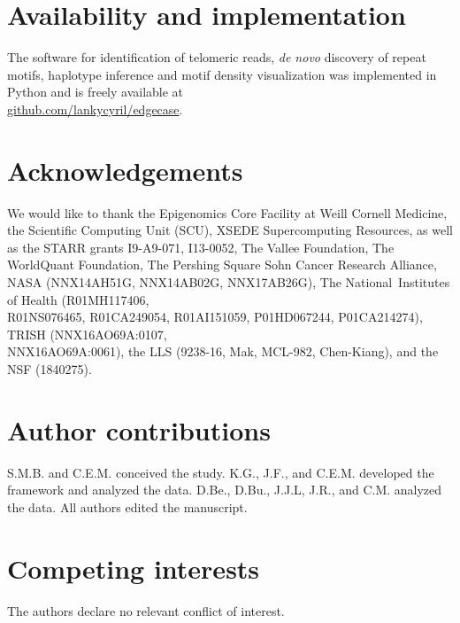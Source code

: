 \documentclass{article}
\begin{document}

\section*{Availability and implementation} 
The software for identification of telomeric reads, \textit{de novo} discovery of repeat motifs, haplotype inference and motif density visualization was implemented in Python and is freely available at \\ \href{https://github.com/lankycyril/edgecase}{github.com/lankycyril/edgecase}.

\section*{Acknowledgements} 
We would like to thank
the Epigenomics Core Facility at Weill Cornell Medicine,
the Scientific Computing Unit (SCU),
XSEDE Supercomputing Resources,
as well as
the STARR grants I9-A9-071, I13-0052,
The Vallee Foundation,
The WorldQuant Foundation,
The Pershing Square Sohn Cancer Research Alliance,
NASA (NNX14AH51G, NNX14AB02G, NNX17AB26G),
The National Institutes of Health (R01MH117406, \\ R01NS076465, R01CA249054, R01AI151059, P01HD067244, P01CA214274),
TRISH (NNX16AO69A:0107, \\ NNX16AO69A:0061),
the LLS (9238-16, Mak, MCL-982, Chen-Kiang),
and
the NSF (1840275).

\section*{Author contributions} 
S.M.B. and C.E.M. conceived the study.
K.G., J.F., and C.E.M. developed the framework and analyzed the data.
D.Be., D.Bu., J.J.L, J.R., and C.M. analyzed the data.
All authors edited the manuscript.

\section*{Competing interests} 
The authors declare no relevant conflict of interest.
\end{document}

